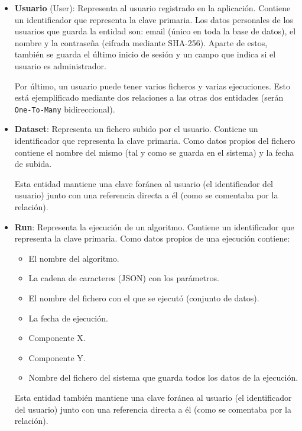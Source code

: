 \begin{itemize}
    \item \textbf{Usuario} (User): Representa al usuario registrado en la
    aplicación. Contiene un identificador que representa la clave primaria. Los
    datos personales de los usuarios que guarda la entidad son: email (único en
    toda la base de datos), el nombre y la contraseña (cifrada mediante
    SHA-256). Aparte de estos, también se guarda el último inicio de sesión y un
    campo que indica si el usuario es administrador.

    Por último, un usuario puede tener varios ficheros y varias ejecuciones.
    Esto está ejemplificado mediante dos relaciones a las otras dos entidades
    (serán \texttt{One-To-Many} bidireccional).

    \item \textbf{Dataset}: Representa un fichero subido por el usuario.
    Contiene un identificador que representa la clave primaria. Como datos
    propios del fichero contiene el nombre del mismo (tal y como se guarda en el
    sistema) y la fecha de subida. 

    Esta entidad mantiene una clave foránea al usuario (el identificador del
    usuario) junto con una referencia directa a él (como se comentaba por la
    relación).

    \item \textbf{Run}: Representa la ejecución de un algoritmo. Contiene un
    identificador que representa la clave primaria. Como datos propios de una
    ejecución contiene:
    \begin{itemize}
        \item El nombre del algoritmo.
        \item La cadena de caracteres (JSON) con los parámetros.
        \item El nombre del fichero con el que se ejecutó (conjunto de datos).
        \item La fecha de ejecución.
        \item Componente X.
        \item Componente Y.
        \item Nombre del fichero del sistema que guarda todos los datos de la ejecución.
    \end{itemize}

    Esta entidad también mantiene una clave foránea al usuario (el identificador
    del usuario) junto con una referencia directa a él (como se comentaba por la
    relación).
\end{itemize}

